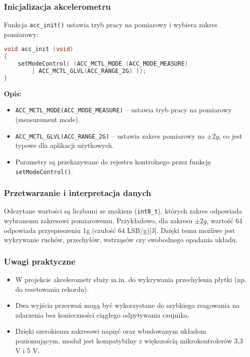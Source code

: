 \documentclass[a4paper,12pt]{report}
\begin{document}
\subsubsection*{Inicjalizacja akcelerometru}

Funkcja \texttt{acc\_init()} ustawia tryb pracy na pomiarowy i wybiera zakres pomiarowy:

\begin{lstlisting}[language=C]
void acc_init (void)
{
    setModeControl( (ACC_MCTL_MODE (ACC_MODE_MEASURE)
        | ACC_MCTL_GLVL(ACC_RANGE_2G) ));
}
\end{lstlisting}

\textbf{Opis:}
\begin{itemize}
    \item \texttt{ACC\_MCTL\_MODE(ACC\_MODE\_MEASURE)} – ustawia tryb pracy na pomiarowy (measurement mode).
    \item \texttt{ACC\_MCTL\_GLVL(ACC\_RANGE\_2G)} – ustawia zakres pomiarowy na \(\pm2g\), co jest typowe dla aplikacji użytkowych.
    \item Parametry są przekazywane do rejestru kontrolnego przez funkcję \texttt{setModeControl()}.
\end{itemize}

\subsubsection*{Przetwarzanie i interpretacja danych}

Odczytane wartości są liczbami ze znakiem (\texttt{int8\_t}), których zakres odpowiada wybranemu zakresowi pomiarowemu. Przykładowo, dla zakresu \(\pm2g\), wartość 64 odpowiada przyspieszeniu 1g (czułość 64 LSB/g)[3]. Dzięki temu możliwe jest wykrywanie ruchów, przechyłów, wstrząsów czy swobodnego opadania układu.

\subsubsection*{Uwagi praktyczne}

\begin{itemize}
    \item W projekcie akcelerometr służy m.in. do wykrywania przechylenia płytki (np. do resetowania rekordu).
    \item Dwa wyjścia przerwań mogą być wykorzystane do szybkiego reagowania na zdarzenia bez konieczności ciągłego odpytywania czujnika.
    \item Dzięki szerokiemu zakresowi napięć oraz wbudowanym układom poziomującym, moduł jest kompatybilny z większością mikrokontrolerów 3,3 V i 5 V.
\end{itemize}
\end{document}
